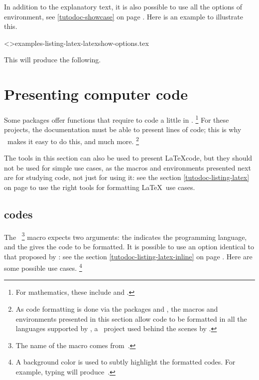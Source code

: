 \begin{tdocexa}
    In addition to the explanatory text, it is also possible to use all the options of  environment, see \ref{tutodoc-showcase} on page \pageref{tutodoc-showcase}.
    Here is an example to illustrate this.

    \medskip

    \tdoclatexinput<>{examples-listing-latex-latexshow-options.tex}

    \smallskip

    This will produce the following.

    \smallskip

    
\end{tdocexa}


\section{Presenting computer code}

Some packages offer functions that require to code a little in \lua.%
\footnote{
	For mathematics, these include  and .
}
For these projects, the documentation must be able to present lines of code; this is why \thisproj\ makes it easy to do this, and much more.%
\footnote{
    As code formatting is done via the packages  and , the macros and environments presented in this section allow code to be formatted in all the languages supported by \pygmentsREF, a \python\ project used behind the scenes by .
}


\begin{tdocimp}
	The tools in this section can also be used to present \LaTeX code, but they should not be used for simple use cases, as the macros and environments presented next are for studying code, not just for using it: see the section \ref{tutodoc-listing-latex} on page \pageref{tutodoc-listing-latex} to use the right tools for formatting \LaTeX\ use cases.
\end{tdocimp}



\subsection{ codes}

The \,%
\footnote{
	The name of the macro  comes from \,.
}
macro expects two arguments: the  indicates the programming language, and the  gives the code to be formatted.
It is possible to use an option identical to that proposed by : see the section \ref{tutodoc-listing-latex-inline} on page \pageref{tutodoc-listing-latex-inline}.
Here are some possible use cases.%
\footnote{
    A background color is used to subtly highlight the formatted codes. For example, typing  will produce \,.
}

